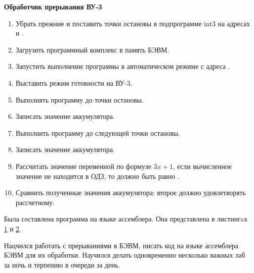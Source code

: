 \textbf{Обработчик прерывания ВУ-3}
\begin{enumerate}
\item Убрать прежние и поставить точки остановы в подпрограмме int3 на адресах  и .
\item Загрузить программный комплекс в память БЭВМ.
\item Запустить выполнение программы в автоматическом режиме с адреса .
\item Выставить режим готовности на ВУ-3.
\item Выполнять программу до точки остановы.
\item Записать значение аккумулятора.
\item Выполнить программу до следующей точки остановы.
\item Записать значение аккумулятора.
\item Рассчитать значение переменной по формуле $3x+1$, если вычисленное значение не находится в ОДЗ, то должно быть равно .
\item Сравнить полученные значения аккумулятора: второе должно удовлетворять рассчетному.
\end{enumerate}


Была составлена программа на языке ассемблера. Она представлена в листингaх \ref{lst:script-p1} и \ref{lst:script-p2}.

\begin{figure}[h] %
    \begin{center}
        
    \end{center}
    \label{lst:script-p1}
\end{figure}

\begin{figure}[h] %
    \begin{center}
        
    \end{center}
    \label{lst:script-p2}
\end{figure}


Нацчился работать с прерываниями в БЭВМ, писать код на языке ассемблера БЭВМ для их обработки. Научился делать одновременно несколько важных лаб за ночь и терпению в очереди за день.

\newpage





